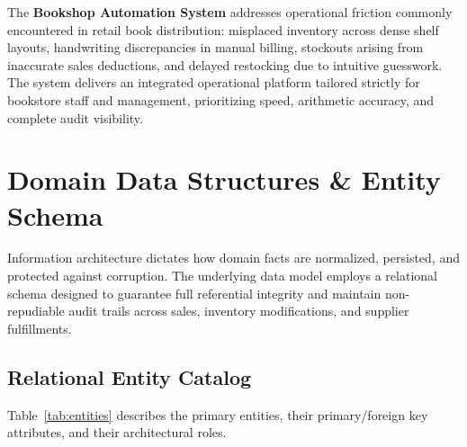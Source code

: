 \documentclass[12pt, a4paper]{report}
\begin{document}
The \textbf{Bookshop Automation System} addresses operational friction commonly encountered in retail book distribution: misplaced inventory across dense shelf layouts, handwriting discrepancies in manual billing, stockouts arising from inaccurate sales deductions, and delayed restocking due to intuitive guesswork. The system delivers an integrated operational platform tailored strictly for bookstore staff and management, prioritizing speed, arithmetic accuracy, and complete audit visibility.

\chapter{Domain Data Structures \& Entity Schema}
Information architecture dictates how domain facts are normalized, persisted, and protected against corruption. The underlying data model employs a relational schema designed to guarantee full referential integrity and maintain non-repudiable audit trails across sales, inventory modifications, and supplier fulfillments.

\section{Relational Entity Catalog}
Table~\ref{tab:entities} describes the primary entities, their primary/foreign key attributes, and their architectural roles.
\end{document}
